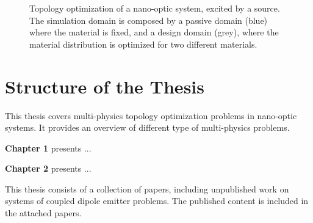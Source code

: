\begin{figure}[tb]
    \centering
    \caption{Topology optimization of a nano-optic system, excited by a source. The simulation domain is composed by a passive domain (blue) where the material is fixed, and a design domain (grey), where the material distribution is optimized for two different materials.}
    \label{fig:top_opt}
\end{figure}

\section{Structure of the Thesis}

This thesis covers multi-physics topology optimization problems in nano-optic systems. It provides an overview
of different type of multi-physics problems.

\textbf{Chapter 1} presents ...

\textbf{Chapter 2} presents ...

This thesis consists of a collection of papers, including unpublished work on
systems of coupled dipole emitter problems. The published content is included in the attached
papers.